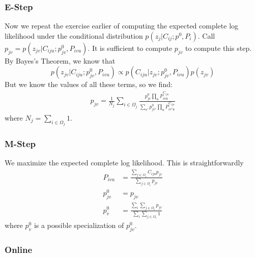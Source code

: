 \documentclass[useAMS,usenatbib,a4paper]{mn2e}
\begin{document}
\subsubsection{E-Step}

Now we repeat the exercise earlier of computing the expected complete log
likelihood under the conditional distribution $p(z_{j} | C_{ij}; p^0,
P_{i})$. Call $p_{jv} = p(z_{jv} | C_{iju}; p^0_{jv}, P_{ivu})$. It is
sufficient to compute $p_{jv}$ to compute this step. By Bayes's Theorem, we
know that
$$
p(z_{jv} | C_{iju}; p^0_{jv}, P_{ivu}) \propto p(C_{iju} | z_{jv}; p^0_{jv},
P_{ivu}) p(z_{jv})
$$
But we know the values of all these terms, so we find:
\begin{align}
  p_{jv} = \frac{1}{N_j} \sum_{i \in \Omega_j} \frac{p^0_{jv} \prod_u
  P_{ivu}^{C_{iju}}}{\sum_{v'} p^0_{jv'} \prod_u P_{iv'u}^{C_{iju}}}
\end{align}
where $N_j = \sum_{i \in \Omega_j} 1$.

\subsubsection{M-Step}

We maximize the expected complete log likelihood. This is straightforwardly
\begin{align}
  P_{ivu} &= \frac{\sum_{j \in \Omega_i} C_{iju} p_{jv}}{\sum_{j \in
\Omega_i} p_{jv}} \\
  p_{jv}^0 &= p_{jv} \\
  p_{v}^0 &= \frac{\sum_i \sum_{j \in \Omega_i} p_{jv}}{\sum_i \sum_{j \in
\Omega_i} 1}
\end{align}
where $p_{v}^0$ is a possible specialization of $p_{jv}^0$.

\subsubsection{Online}
\end{document}
